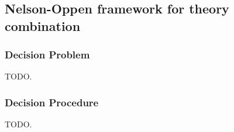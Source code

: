 \subsection{Nelson-Oppen framework for theory combination}

\subsubsection{Decision Problem}

TODO.

\subsubsection{Decision Procedure}

TODO.

